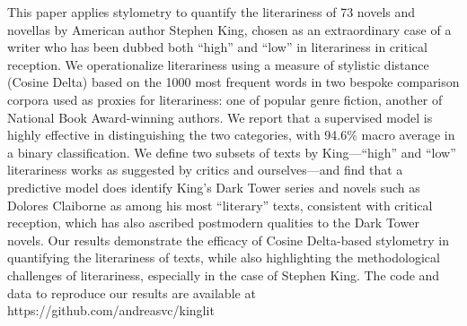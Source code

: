 This paper applies stylometry to quantify the literariness of 73 novels and novellas by American author Stephen King, chosen as an extraordinary case of a writer who has been dubbed both ``high'' and ``low'' in literariness in critical reception. We operationalize literariness using a measure of stylistic distance (Cosine Delta) based on the 1000 most frequent words in two bespoke comparison corpora used as proxies for literariness: one of popular genre fiction, another of National Book Award-winning authors. We report that a supervised model is highly effective in distinguishing the two categories, with 94.6\% macro average in a binary classification. We define two subsets of texts by King---``high'' and ``low'' literariness works as suggested by critics and ourselves---and find that a predictive model does identify King's Dark Tower series and novels such as Dolores Claiborne as among his most ``literary'' texts, consistent with critical reception, which has also ascribed postmodern qualities to the Dark Tower novels. Our results demonstrate the efficacy of Cosine Delta-based stylometry in quantifying the literariness of texts, while also highlighting the methodological challenges of literariness, especially in the case of Stephen King. The code and data to reproduce our results are available at https://github.com/andreasvc/kinglit
